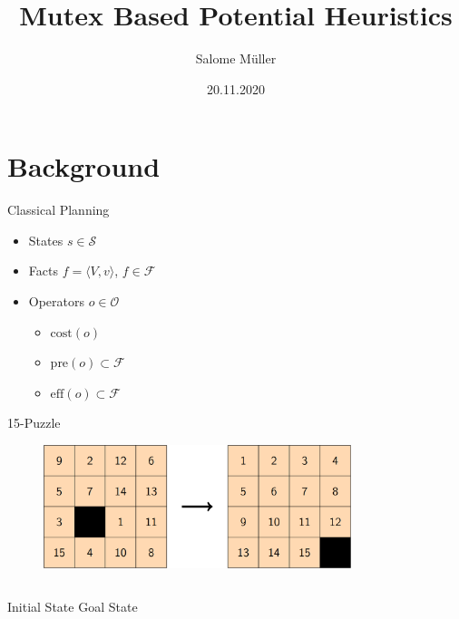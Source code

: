 \documentclass[aspectratio=169]{beamer}
\title              {Mutex Based Potential Heuristics}
\author             {Salome M\"uller}
\institute          {Department of Mathematics and Computer Science, University of Basel}
\date               {20.11.2020}
\begin{document}
    \begin{frame}[t,plain]
        \titlepage
    \end{frame}


    \section{Background}

    \begin{frame}[c]{Classical Planning}
        \begin{itemize}
            \item States $s\in\mathcal{S}$
            \item Facts $f = \langle V, v  \rangle$, $f\in\mathcal{F}$
            \item Operators $o\in\mathcal{O}$
                \begin{itemize}
                    \item $\text{cost}(o)$
                    \item $\text{pre}(o)\subset\mathcal{F}$
                    \item $\text{eff}(o)\subset\mathcal{F}$
                \end{itemize}
        \end{itemize}
    \end{frame}

    \begin{frame}[c]{15-Puzzle}
        \begin{figure}
            \includegraphics[width=0.8\textwidth]{15-puzzle}
        \end{figure}
        \begin{columns}[c]
            \center Initial State
            \center Goal State
        \end{columns}
    \end{frame}
\end{document}
